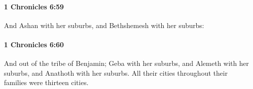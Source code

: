 		\paragraph{1 Chronicles 6:59} %
			\label{1CHRONICLES-6-59}

			And Ashan with her suburbs, and Bethshemesh with her suburbs:


		\paragraph{1 Chronicles 6:60} %
			\label{1CHRONICLES-6-60}

			And out of the tribe of Benjamin; Geba with her suburbs, and Alemeth with her suburbs, and Anathoth with her suburbs. All their cities throughout their families were thirteen cities.


